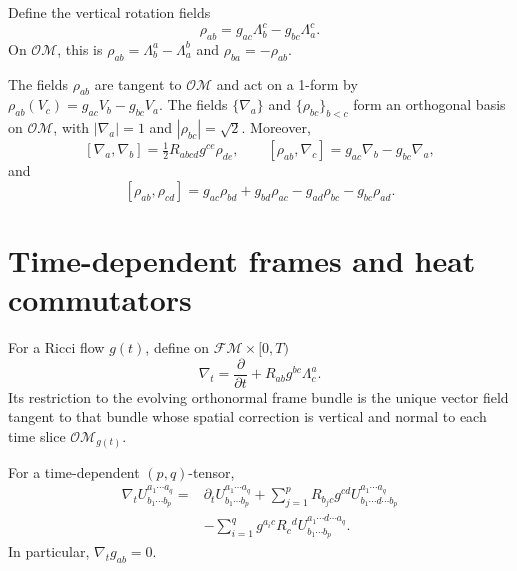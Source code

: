 \begin{definition}
\label{def:chow-ii-rotation-fields}
Define the vertical rotation fields
\[
 \rho_{ab}=g_{ac}\Lambda^c_b-g_{bc}\Lambda^c_a.
\]
On $\mathcal O\mathcal M$, this is $\rho_{ab}=\Lambda^a_b-\Lambda^b_a$ and
$\rho_{ba}=-\rho_{ab}$.
\end{definition}

\begin{lemma}
\label{lem:chow-ii-orthonormal-frame-bundle}
The fields $\rho_{ab}$ are tangent to $\mathcal O\mathcal M$ and act on a
1-form by $\rho_{ab}(V_c)=g_{ac}V_b-g_{bc}V_a$.  The fields
$\{\nabla_a\}$ and $\{\rho_{bc}\}_{b<c}$ form an orthogonal basis on
$\mathcal O\mathcal M$, with $|\nabla_a|=1$ and $|\rho_{bc}|=\sqrt2$.  Moreover,
\[
 [\nabla_a,\nabla_b]=\tfrac12R_{abcd}g^{ce}\rho_{de},
 \qquad
 [\rho_{ab},\nabla_c]=g_{ac}\nabla_b-g_{bc}\nabla_a,
\]
and
\[
 [\rho_{ab},\rho_{cd}]=g_{ac}\rho_{bd}+g_{bd}\rho_{ac}
 -g_{ad}\rho_{bc}-g_{bc}\rho_{ad}.
\]
\end{lemma}

\section{Time-dependent frames and heat commutators}

\begin{definition}
\label{def:chow-ii-frame-time-vector}
For a Ricci flow $g(t)$, define on $\mathcal F\mathcal M\times[0,T)$
\[
 \nabla_t=\frac{\partial}{\partial t}+R_{ab}g^{bc}\Lambda^a_c.
\]
Its restriction to the evolving orthonormal frame bundle is the unique vector
field tangent to that bundle whose spatial correction is vertical and normal
to each time slice $\mathcal O\mathcal M_{g(t)}$.
\end{definition}

\begin{lemma}
\label{lem:chow-ii-time-covariant-derivative}
For a time-dependent $(p,q)$-tensor,
\[
\begin{aligned}
 \nabla_t U^{a_1\cdots a_q}_{b_1\cdots b_p}
 ={}&\partial_tU^{a_1\cdots a_q}_{b_1\cdots b_p}
 +\sum_{j=1}^pR_{b_jc}g^{cd}U^{a_1\cdots a_q}_{b_1\cdots d\cdots b_p}\\
 &-\sum_{i=1}^qg^{a_ic}R_c{}^dU^{a_1\cdots d\cdots a_q}_{b_1\cdots b_p}.
\end{aligned}
\]
In particular, $\nabla_tg_{ab}=0$.
\end{lemma}

